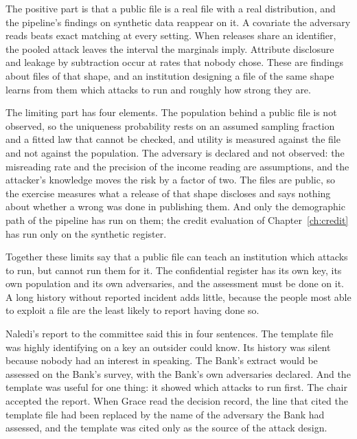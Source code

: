 The positive part is that a public file is a real file with a real distribution, and the
pipeline's findings on synthetic data reappear on it. A covariate the adversary reads
beats exact matching at every setting. When releases share an identifier, the pooled
attack leaves the interval the marginals imply. Attribute disclosure and leakage by
subtraction occur at rates that nobody chose. These are findings about files of that
shape, and an institution designing a file of the same shape learns from them which
attacks to run and roughly how strong they are.

The limiting part has four elements. The population behind a public file is not observed,
so the uniqueness probability rests on an assumed sampling fraction and a fitted law that
cannot be checked, and utility is measured against the file and not against the
population. The adversary is declared and not observed: the misreading rate and the
precision of the income reading are assumptions, and the attacker's knowledge moves the
risk by a factor of two. The files are public, so the exercise measures what a release of
that shape discloses and says nothing about whether a wrong was done in publishing them.
And only the demographic path of the pipeline has run on them; the credit evaluation of
Chapter~\ref{ch:credit} has run only on the synthetic register.

Together these limits say that a public file can teach an institution which attacks to
run, but cannot run them for it. The confidential register has its own key, its own
population and its own adversaries, and the assessment must be done on it. A long
history without reported incident adds little, because the people most able to exploit a
file are the least likely to report having done so.

Naledi's report to the committee said this in four sentences. The template file was
highly identifying on a key an outsider could know. Its history was silent because nobody
had an interest in speaking. The Bank's extract would be assessed on the Bank's survey,
with the Bank's own adversaries declared. And the template was useful for one thing: it
showed which attacks to run first. The chair accepted the report. When Grace read the
decision record, the line that cited the template file had been replaced by the name of
the adversary the Bank had assessed, and the template was cited only as the source of the
attack design.

